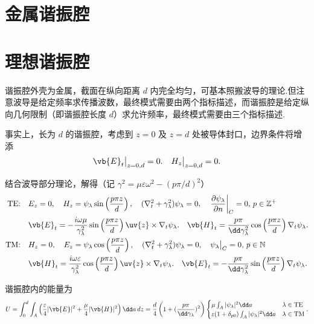 \section{金属谐振腔}
\section{理想谐振腔}

谐振腔外壳为金属，截面在纵向距离 \(d\) 内完全均匀，可基本照搬波导的理论.但注意波导是给定频率求传播波数，最终模式需要由两个指标描述，而谐振腔是给定纵向几何限制（即谐振腔长度 \(d\)）求允许频率，最终模式需要由三个指标描述.

事实上，长为 \(d\) 的谐振腔，考虑到 \(z = 0\) 及 \(z = d\) 处被导体封口，边界条件将增添
\begin{align*}
	\vb{E}_t \big|_{z=0,d} = 0. \quad H_z \big|_{z=0,d} = 0.
\end{align*}

结合波导部分理论，解得（记 \(\gamma^2 = \mu\varepsilon\omega^2 - (p\pi/d)^2\)）
\begin{align*}
	\text{TE:}\quad& E_z = 0,\quad H_z = \psi_{\lambda} \sin\left(\dfrac{p\pi z}{d}\right),\quad (\nabla_t^2 + \gamma_{\lambda}^2) \psi_{\lambda} = 0,\quad \left. \dfrac{\partial \psi_{\lambda}}{\partial n} \right|_C = 0,\,p \in \mathbb{Z}^+\\
	&\vb{E}_t = -\dfrac{i\omega\mu}{\gamma_{\lambda}^2} \sin\left(\dfrac{p\pi z}{d}\right) \uv{z} \times \nabla_t \psi_{\lambda}. \quad \vb{H}_t = \dfrac{p\pi}{\dd \gamma_{\lambda}^2} \cos\left(\dfrac{p\pi z}{d}\right) \nabla_t \psi_{\lambda}.\\
	\text{TM:}\quad& H_z = 0,\quad E_z = \psi_{\lambda} \cos\left(\dfrac{p\pi z}{d}\right),\quad(\nabla_t^2 + \gamma_{\lambda}^2) \psi_{\lambda} = 0,\quad\psi_{\lambda} \big|_C = 0,\,p \in \mathbb{N}\\
	&\vb{H}_t = \dfrac{i\omega\varepsilon}{\gamma_{\lambda}^2} \cos\left(\dfrac{p\pi z}{d}\right) \uv{z} \times \nabla_t \psi_{\lambda}. \quad \vb{E}_t = -\dfrac{p\pi}{\dd \gamma_{\lambda}^2} \sin\left(\dfrac{p\pi z}{d}\right) \nabla_t \psi_{\lambda}.
\end{align*}

谐振腔内的能量为
\begin{align*}
	U = \int_0^d \int_A \left( \dfrac{\varepsilon}{4} |\vb{E}|^2 + \dfrac{\mu}{4} |\vb{H}|^2 \right) \dd a \, dz = \dfrac{ d}{4}\left(1+(\frac{p\pi}{\dd \gamma_{\lambda}})^2\right)  \begin{cases}
		\mu \int_A |\psi_{\lambda}|^2 \dd a                           & \lambda \in \text{TE} \\
		\varepsilon (1 + \delta_{p0}) \int_A |\psi_{\lambda}|^2 \dd a & \lambda \in \text{TM}
	\end{cases}.
\end{align*}

